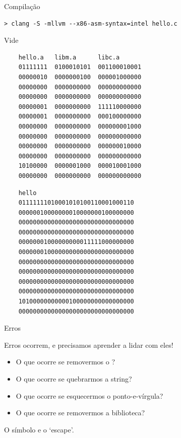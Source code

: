 \documentclass{beamer}
\begin{document}
\begin{frame}{Compilação}
  \begin{lstlisting}[style=normalbash]
    > clang -S -mllvm --x86-asm-syntax=intel hello.c
  \end{lstlisting}

  Vide 

  \framebreak

  \begin{lstlisting}
    hello.a   libm.a      libc.a
    01111111  0100010101  001100010001
    00000010  0000000100  000001000000
    00000000  0000000000  000000000000
    00000000  0000000000  000000000000
    00000001  0000000000  111110000000
    00000001  0000000000  000100000000
    00000000  0000000000  000000001000
    00000000  0000000000  000000000000
    00000000  0000000000  000000010000
    00000000  0000000000  000000000000
    10100000  0000001000  000010001000
    00000000  0000000000  000000000000
  \end{lstlisting}

  \framebreak

  \begin{lstlisting}
    hello
    01111111010001010100110001000110
    00000010000000010000000100000000
    00000000000000000000000000000000
    00000000000000000000000000000000
    00000001000000000011111000000000
    00000001000000000000000000000000
    00000000000000000000000000000000
    00000000000000000000000000000000
    00000000000000000000000000000000
    00000000000000000000000000000000
    10100000000000100000000000000000
    00000000000000000000000000000000
  \end{lstlisting}

\end{frame}

\begin{frame}{Erros}

  Erros ocorrem, e precisamos aprender a lidar com eles!

  \begin{itemize}
  \item O que ocorre se removermos o \ilcode{\\n}?
  \item O que ocorre se quebrarmos a string?
  \item O que ocorre se esquecermos o ponto-e-vírgula?
  \item O que ocorre se removermos a biblioteca?
  \end{itemize}
  
  O símbolo \ilcode{\\n} e o `escape'.

\end{frame}
\end{document}
